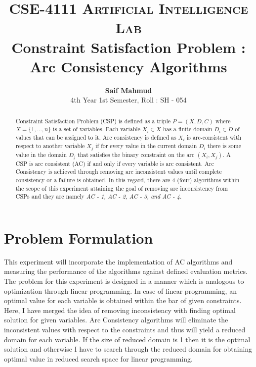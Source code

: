 \documentclass[a4paper]{article}
\title{
		\usefont{OT1}{bch}{b}{n}
		\normalfont \normalsize \textsc{CSE-4111 Artificial Intelligence Lab} \\ [10pt]
		\huge Constraint Satisfaction Problem : Arc Consistency Algorithms \\
}
\author[0]{\textbf{Saif Mahmud}\\
		4th Year 1st Semester, Roll : SH - 054\\}
\begin{document}
\maketitle

\begin{abstract}
Constraint Satisfaction Problem (CSP) is defined as a triple $ P = (X, D, C) $ where $ X = \{1,...,n\} $ is a set of variables. Each variable $ X_{i} ∈ X $ has a finite domain $ D_{i} ∈ D $ of values that can be assigned to it. Arc consistency is defined as $ X_{i} $ is arc-consistent with respect to another variable $ X_{j} $ if for every value in the current domain $ D_{i} $ there is some value in the domain $ D_{j} $ that satisfies the binary constraint on the arc $ (X_{i} , X_{j}) $. A CSP is arc consistent (AC) if and only if every variable is arc consistent. Arc Consistency is achieved through removing arc inconsistent values until complete consistency or a failure is obtained. In this regard, there are 4 (four) algorithms within the scope of this experiment attaining the goal of removing arc inconsistency from CSPs and they are namely \textit{AC - 1, AC - 2, AC - 3, and AC - 4}.
\end{abstract}
\section*{Problem Formulation}
This experiment will incorporate the implementation of AC algorithms and measuring the performance of the algorithms against defined evaluation metrics. The problem for this experiment is designed in a manner which is analogous to optimization through linear programming. In case of linear programming, an optimal value for each variable is obtained within the bar of given constraints. Here, I have merged the idea of removing inconsistency with finding optimal solution for given variables. Arc Consistency algorithms will eliminate the inconsistent values with respect to the constraints and thus will yield a reduced domain for each variable. If the size of reduced domain is 1 then it is the optimal solution and otherwise I have to search through the reduced domain for obtaining optimal value in reduced search space for linear programming.
\end{document}
